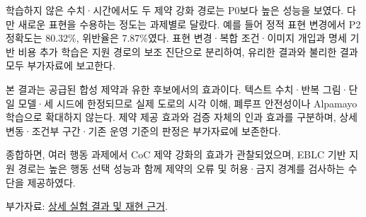 \documentclass[11pt,a4paper]{article}
\begin{document}
학습하지 않은 수치·시간에서도 두 제약 강화 경로는 P0보다 높은 성능을 보였다. 다만 새로운 표현을 수용하는 정도는 과제별로 달랐다. 예를 들어 정적 표현 변경에서 P2 정확도는 80.32\%, 위반율은 7.87\%였다. 표현 변경·복합 조건·이미지 개입과 명세 기반 비용 추가 학습은 지원 경로의 보조 진단으로 분리하여, 유리한 결과와 불리한 결과 모두 부가자료에 보고한다.\par

본 결과는 공급된 합성 제약과 유한 후보에서의 효과이다. 텍스트 수치·반복 그림·단일 모델·세 시드에 한정되므로 실제 도로의 시각 이해, 폐루프 안전성이나 Alpamayo 학습으로 확대하지 않는다. 제약 제공 효과와 검증 자체의 인과 효과를 구분하며, 상세 변동·조건부 구간·기존 운영 기준의 판정은 부가자료에 보존한다.\par

종합하면, 여러 행동 과제에서 CoC 제약 강화의 효과가 관찰되었으며, EBLC 기반 지원 경로는 높은 행동 선택 성능과 함께 제약의 오류 및 허용·금지 경계를 검사하는 수단을 제공하였다.\par

부가자료: \href{\detokenize{ieee-access-experiments-supplement-v01-ko.pdf}}{상세 실험 결과 및 재현 근거}.\par
\end{document}
